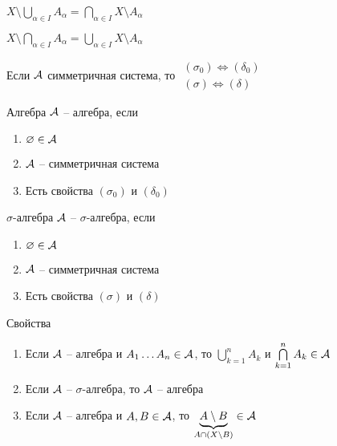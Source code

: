 \documentclass[12pt]{article}
\begin{document}
\begin{Reminder}{}
    $X \setminus \bigcup\limits_{\alpha \in I} A_\alpha = \bigcap\limits_{\alpha \in I} X \setminus A_\alpha$

    $X \setminus \bigcap\limits_{\alpha \in I} A_\alpha = \bigcup\limits_{\alpha \in I} X \setminus A_\alpha$
\end{Reminder}

\begin{propos}{}
    Если $\mathcal{A}$ симметричная система, то $\begin{gathered}
        (\sigma_0) \Leftrightarrow (\delta_0) \\
        (\sigma) \Leftrightarrow (\delta)
    \end{gathered}$
\end{propos}

\begin{defin}{Алгебра}
    $\mathcal{A}$ -- алгебра, если

    \begin{enumerate}
        \item $\varnothing \in \mathcal{A}$
        \item $\mathcal{A}$ -- симметричная система 
        \item Есть свойства $(\sigma_0)$ и $(\delta_0)$
    \end{enumerate}
\end{defin}

\begin{defin}{$\sigma$-алгебра}
    $\mathcal{A}$ -- $\sigma$-алгебра, если 

    \begin{enumerate}
        \item $\varnothing \in \mathcal{A}$
        \item $\mathcal{A}$ -- симметричная система
        \item Есть свойства $(\sigma)$ и $(\delta)$
    \end{enumerate}
\end{defin}

\begin{theo}{Свойства}
    \begin{enumerate}
        \item Если $\mathcal{A}$ -- алгебра и $A_1 \ldots A_n \in \mathcal{A}$, то $\bigcup\limits_{k = 1}^n A_k$ и $\bigcap\limits_{k = 1}^n A_k \in \mathcal{A}$
        \item Если $\mathcal{A}$ -- $\sigma$-алгебра, то $\mathcal{A}$ -- алгебра
        \item Если $\mathcal{A}$ -- алгебра и $A, B \in \mathcal{A}$, то $\underbrace{A \setminus B}_{A \cap (X \setminus B)} \in \mathcal{A}$ 
    \end{enumerate}
\end{theo}
\end{document}
